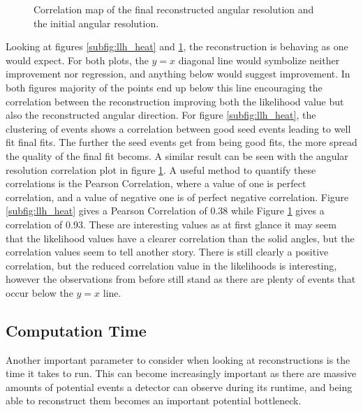 \begin{figure}[ht]
\begin{minipage}[b]{0.48\linewidth}
    \caption{Correlation map of the final reconstructed angular resolution and the initial angular resolution.}
    \label{subfig:alpha_heat}
  \end{minipage}
\end{figure}

Looking at figures \ref{subfig:llh_heat} and \ref{subfig:alpha_heat}, the reconstruction is behaving as one would expect. For both plots, the $y=x$ diagonal line would symbolize neither improvement nor regression, and anything below would suggest improvement. In both figures majority of the points end up below this line encouraging the correlation between the reconstruction improving both the likelihood value but also the reconstructed angular direction. For figure \ref{subfig:llh_heat}, the clustering of events shows a correlation between good seed events leading to well fit final fits. The further the seed events get from being good fits, the more spread the quality of the final fit becoms. A similar result can be seen with the angular resolution correlation plot in figure \ref{subfig:alpha_heat}. A useful method to quantify these correlations is the Pearson Correlation, where a value of one is perfect correlation, and a value of negative one is of perfect negative correlation. Figure \ref{subfig:llh_heat} gives a Pearson Correlation of 0.38 while Figure \ref{subfig:alpha_heat} gives a correlation of 0.93. These are interesting values as at first glance it may seem that the likelihood values have a clearer correlation than the solid angles, but the correlation values seem to tell another story. There is still clearly a positive correlation, but the reduced correlation value in the likelihoods is interesting, however the observations from before still stand as there are plenty of events that occur below the $y=x$ line. 

\subsection{Computation Time}

Another important parameter to consider when looking at reconstructions is the time it takes to run. This can become increasingly important as there are massive amounts of potential events a detector can observe during its runtime, and being able to reconstruct them becomes an important potential bottleneck. 

